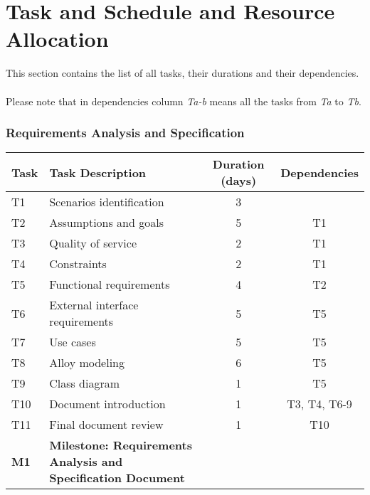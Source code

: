 \section{Task and Schedule and Resource Allocation}
This section contains the list of all tasks, their durations and their dependencies.\\
\\
Please note that in dependencies column \textit{Ta-b} means all the tasks from \textit{Ta} to \textit{Tb}.

\subsubsection{Requirements Analysis and Specification}
\begin{tabular}{| l | p{7cm}  | c |  c |}
\hline
\textbf{Task} & \textbf{Task Description} & \textbf{Duration (days)} & \textbf{Dependencies}\\
\hline
T1 & Scenarios identification & 3 & \\
\hline
T2 & Assumptions and goals & 5 & T1\\
\hline
T3 & Quality of service & 2 & T1\\
\hline
T4 & Constraints & 2 & T1\\
\hline
T5 & Functional requirements & 4 & T2\\
\hline
T6 & External interface requirements & 5 & T5\\
\hline
T7 & Use cases & 5 & T5\\
\hline
T8 & Alloy modeling & 6 & T5\\
\hline
T9 & Class diagram & 1 & T5\\
\hline
T10 & Document introduction & 1 & T3, T4, T6-9\\
\hline
T11 & Final document review & 1 & T10\\
\hline
\textbf{M1} & \textbf{Milestone: Requirements Analysis and Specification Document} &  & \\
\hline
\end{tabular}

